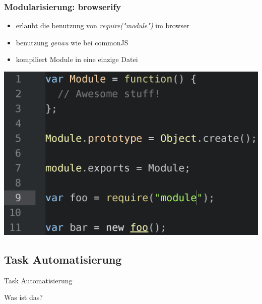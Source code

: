 \documentclass{beamer}
\begin{document}

\begin{frame}
\frametitle{Modularisierung: browserify}
\begin{itemize}
\item erlaubt die benutzung von \textit{require("module")} im browser
\item benutzung \textit{genau} wie bei commonJS
\item kompiliert Module in eine einzige Datei
\end{itemize}
\includegraphics[scale=0.179]{assets/browserify.png}
\end{frame}




\subsection{Task Automatisierung}

\begin{frame}
\Huge{
\centerline{Task Automatisierung}
\centerline{{\small Was ist das?}}
}
\end{frame}







\end{document}
